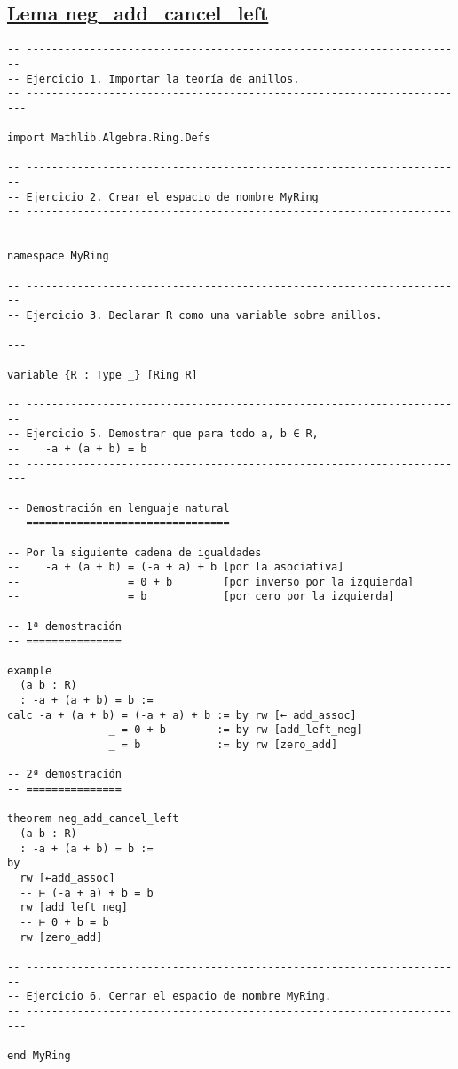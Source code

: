 \subsection{\href{./src/Basicos/neg\_add\_cancel\_left.lean}{Lema neg\_add\_cancel\_left}}
\label{sec:orgee34f0b}
\begin{verbatim}
-- ---------------------------------------------------------------------
-- Ejercicio 1. Importar la teoría de anillos.
-- ----------------------------------------------------------------------

import Mathlib.Algebra.Ring.Defs

-- ---------------------------------------------------------------------
-- Ejercicio 2. Crear el espacio de nombre MyRing
-- ----------------------------------------------------------------------

namespace MyRing

-- ---------------------------------------------------------------------
-- Ejercicio 3. Declarar R como una variable sobre anillos.
-- ----------------------------------------------------------------------

variable {R : Type _} [Ring R]

-- ---------------------------------------------------------------------
-- Ejercicio 5. Demostrar que para todo a, b ∈ R,
--    -a + (a + b) = b
-- ----------------------------------------------------------------------

-- Demostración en lenguaje natural
-- ================================

-- Por la siguiente cadena de igualdades
--    -a + (a + b) = (-a + a) + b [por la asociativa]
--                 = 0 + b        [por inverso por la izquierda]
--                 = b            [por cero por la izquierda]

-- 1ª demostración
-- ===============

example
  (a b : R)
  : -a + (a + b) = b :=
calc -a + (a + b) = (-a + a) + b := by rw [← add_assoc]
                _ = 0 + b        := by rw [add_left_neg]
                _ = b            := by rw [zero_add]

-- 2ª demostración
-- ===============

theorem neg_add_cancel_left
  (a b : R)
  : -a + (a + b) = b :=
by
  rw [←add_assoc]
  -- ⊢ (-a + a) + b = b
  rw [add_left_neg]
  -- ⊢ 0 + b = b
  rw [zero_add]

-- ---------------------------------------------------------------------
-- Ejercicio 6. Cerrar el espacio de nombre MyRing.
-- ----------------------------------------------------------------------

end MyRing
\end{verbatim}

